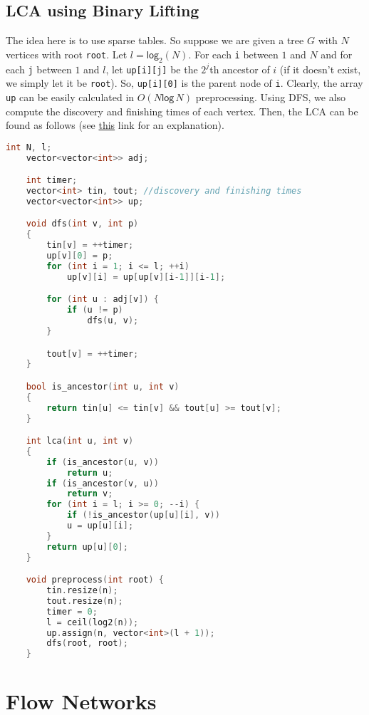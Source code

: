 \documentclass[12pt,a4paper]{amsart}
\numberwithin{equation}{section}
\theoremstyle{definition}
\begin{document}
\subsection{LCA using Binary Lifting} The idea here is to use sparse tables. So suppose we are given a tree $G$ with $N$ vertices with root \verb|root|. Let $l = \mathsf{log}_2(N)$. For each \verb|i| between $1$ and $N$ and for each \verb|j| between $1$ and $l$, let \verb|up[i][j]| be the $2^{j}$th ancestor of $i$ (if it doesn't exist, we simply let it be \verb|root|). So, \verb|up[i][0]| is the parent node of \verb|i|. Clearly, the array \verb|up| can be easily calculated in $O(N\mathsf{log\,}N)$ preprocessing. Using DFS, we also compute the discovery and finishing times of each vertex. Then, the LCA can be found as follows (see \href{https://cp-algorithms.com/graph/lca_binary_lifting.html}{this} link for an explanation).

\begin{lstlisting}[language=C++]
    int N, l;
    vector<vector<int>> adj;

    int timer;
    vector<int> tin, tout; //discovery and finishing times
    vector<vector<int>> up;

    void dfs(int v, int p)
    {
        tin[v] = ++timer;
        up[v][0] = p; 
        for (int i = 1; i <= l; ++i)
            up[v][i] = up[up[v][i-1]][i-1];

        for (int u : adj[v]) {
            if (u != p)
                dfs(u, v);
        }

        tout[v] = ++timer;
    }

    bool is_ancestor(int u, int v)
    {
        return tin[u] <= tin[v] && tout[u] >= tout[v];
    }

    int lca(int u, int v)
    {
        if (is_ancestor(u, v))
            return u;
        if (is_ancestor(v, u))
            return v;
        for (int i = l; i >= 0; --i) {
            if (!is_ancestor(up[u][i], v))
            u = up[u][i];
        }
        return up[u][0];
    }

    void preprocess(int root) {
        tin.resize(n);
        tout.resize(n);
        timer = 0;
        l = ceil(log2(n));
        up.assign(n, vector<int>(l + 1));
        dfs(root, root);
    }
\end{lstlisting}


\section{Flow Networks}
\end{document}
